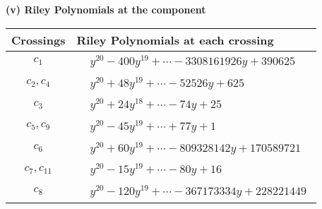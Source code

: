 \documentclass[1p]{elsarticle_modified}
\theoremstyle{definition}
\begin{document}
\newpage\renewcommand{\arraystretch}{1}
\flushleft \textbf{(v) Riley Polynomials at the component}\newline \\
\begin{tabular}{m{50pt}|m{274pt}}
Crossings & \hspace{64pt}Riley Polynomials at each crossing \\
\hline $$\begin{aligned}c_{1}\end{aligned}$$&$\begin{aligned}
&y^{20}-400 y^{19}+\cdots-3308161926 y+390625
\end{aligned}$\\
\hline $$\begin{aligned}c_{2},c_{4}\end{aligned}$$&$\begin{aligned}
&y^{20}+48 y^{19}+\cdots-52526 y+625
\end{aligned}$\\
\hline $$\begin{aligned}c_{3}\end{aligned}$$&$\begin{aligned}
&y^{20}+24 y^{18}+\cdots-74 y+25
\end{aligned}$\\
\hline $$\begin{aligned}c_{5},c_{9}\end{aligned}$$&$\begin{aligned}
&y^{20}-45 y^{19}+\cdots+77 y+1
\end{aligned}$\\
\hline $$\begin{aligned}c_{6}\end{aligned}$$&$\begin{aligned}
&y^{20}+60 y^{19}+\cdots-809328142 y+170589721
\end{aligned}$\\
\hline $$\begin{aligned}c_{7},c_{11}\end{aligned}$$&$\begin{aligned}
&y^{20}-15 y^{19}+\cdots-80 y+16
\end{aligned}$\\
\hline $$\begin{aligned}c_{8}\end{aligned}$$&$\begin{aligned}
&y^{20}-120 y^{19}+\cdots-367173334 y+228221449
\end{aligned}$\\

\end{tabular}
\end{document}
